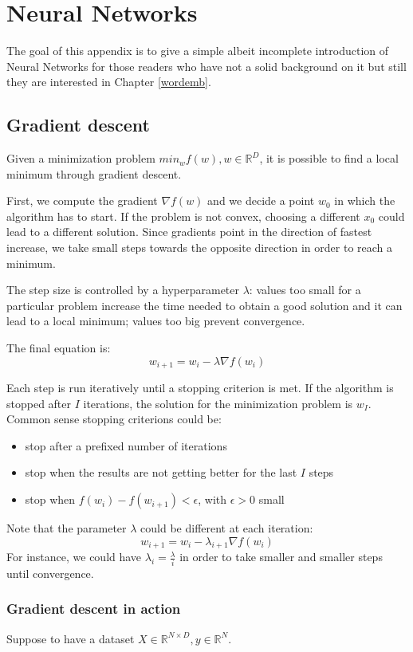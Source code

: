 \chapter{Neural Networks}
The goal of this appendix is to give a simple albeit incomplete introduction of
Neural Networks for those readers who have not a solid background on it but
still they are interested in Chapter \ref{wordemb}.

\section{Gradient descent}
Given a minimization problem $min_w f(w), w \in \mathbb{R}^D$,
it is possible to find a local minimum through gradient descent.

First, we compute the gradient $\nabla f(w)$ and we decide a point $w_0$ in which the algorithm has to start.
If the problem is not convex, choosing a different $x_0$ could lead to a different
solution.
Since gradients point in the direction of fastest increase,
we take small steps towards the opposite direction in order to reach a minimum.

The step size is controlled by a hyperparameter $\lambda$:
values too small for a particular problem increase
the time needed to obtain a good solution and
it can lead to a local minimum;
values too big prevent convergence.

The final equation is:
$$ w_{i+1} = w_{i} - \lambda \nabla f(w_i) $$

Each step is run iteratively until a stopping criterion is met.
If the algorithm is stopped after $I$ iterations, the solution
for the minimization problem is $w_{I}$.
Common sense stopping criterions could be:
\begin{itemize}
    \item stop after a prefixed number of iterations
    \item stop when the results are not getting better for the last $I$ steps
    \item stop when $f(w_i) - f(w_{i+1}) < \epsilon$, with $\epsilon > 0$ small
\end{itemize}

Note that the parameter $\lambda$ could be different at each iteration:
$$ w_{i+1} = w_{i} - \lambda_{i+1} \nabla f(w_i) $$
For instance, we could have $\lambda_i = \frac{\lambda}{i}$ in order to take
smaller and smaller steps until convergence.

\subsection{Gradient descent in action} \label{gradesc}
Suppose to have a dataset $X \in \mathbb{R}^{N \times D}, y \in \mathbb{R}^N$.

